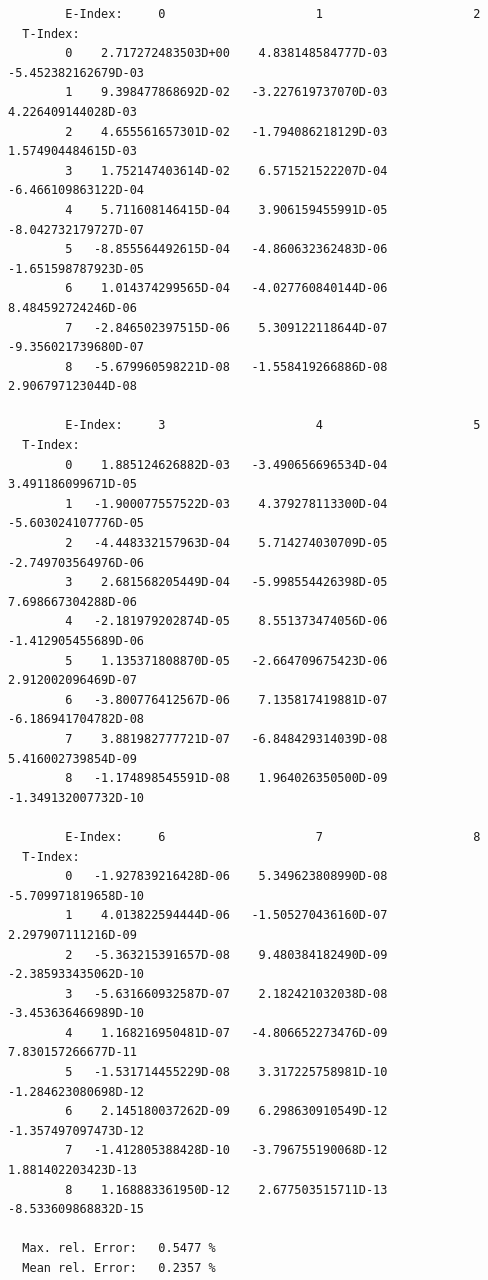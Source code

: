 \documentclass[12pt,dvips]{article}
\begin{document}
\begin{small}\begin{verbatim}
        E-Index:     0                     1                     2
  T-Index:
        0    2.717272483503D+00    4.838148584777D-03   -5.452382162679D-03
        1    9.398477868692D-02   -3.227619737070D-03    4.226409144028D-03
        2    4.655561657301D-02   -1.794086218129D-03    1.574904484615D-03
        3    1.752147403614D-02    6.571521522207D-04   -6.466109863122D-04
        4    5.711608146415D-04    3.906159455991D-05   -8.042732179727D-07
        5   -8.855564492615D-04   -4.860632362483D-06   -1.651598787923D-05
        6    1.014374299565D-04   -4.027760840144D-06    8.484592724246D-06
        7   -2.846502397515D-06    5.309122118644D-07   -9.356021739680D-07
        8   -5.679960598221D-08   -1.558419266886D-08    2.906797123044D-08

        E-Index:     3                     4                     5
  T-Index:
        0    1.885124626882D-03   -3.490656696534D-04    3.491186099671D-05
        1   -1.900077557522D-03    4.379278113300D-04   -5.603024107776D-05
        2   -4.448332157963D-04    5.714274030709D-05   -2.749703564976D-06
        3    2.681568205449D-04   -5.998554426398D-05    7.698667304288D-06
        4   -2.181979202874D-05    8.551373474056D-06   -1.412905455689D-06
        5    1.135371808870D-05   -2.664709675423D-06    2.912002096469D-07
        6   -3.800776412567D-06    7.135817419881D-07   -6.186941704782D-08
        7    3.881982777721D-07   -6.848429314039D-08    5.416002739854D-09
        8   -1.174898545591D-08    1.964026350500D-09   -1.349132007732D-10

        E-Index:     6                     7                     8
  T-Index:
        0   -1.927839216428D-06    5.349623808990D-08   -5.709971819658D-10
        1    4.013822594444D-06   -1.505270436160D-07    2.297907111216D-09
        2   -5.363215391657D-08    9.480384182490D-09   -2.385933435062D-10
        3   -5.631660932587D-07    2.182421032038D-08   -3.453636466989D-10
        4    1.168216950481D-07   -4.806652273476D-09    7.830157266677D-11
        5   -1.531714455229D-08    3.317225758981D-10   -1.284623080698D-12
        6    2.145180037262D-09    6.298630910549D-12   -1.357497097473D-12
        7   -1.412805388428D-10   -3.796755190068D-12    1.881402203423D-13
        8    1.168883361950D-12    2.677503515711D-13   -8.533609868832D-15

  Max. rel. Error:   0.5477 %
  Mean rel. Error:   0.2357 %


\end{verbatim}\end{small}
\end{document}
